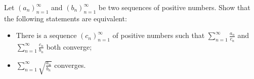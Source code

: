 Let \((a_n)_{n=1}^{\infty}\) and \((b_n)_{n=1}^{\infty}\) be two sequences of positive numbers. Show that the following statements are equivalent:
\begin{itemize}
	\item There is a sequence \((c_n)_{n=1}^{\infty}\) of positive numbers such that \(\sum_{n=1}^{\infty}{\frac{a_n}{c_n}}\) and \(\sum_{n=1}^{\infty}{\frac{c_n}{b_n}}\) both converge;
	\item \(\sum_{n=1}^{\infty}{\sqrt{\frac{a_n}{b_n}}}\) converges.
\end{itemize}

